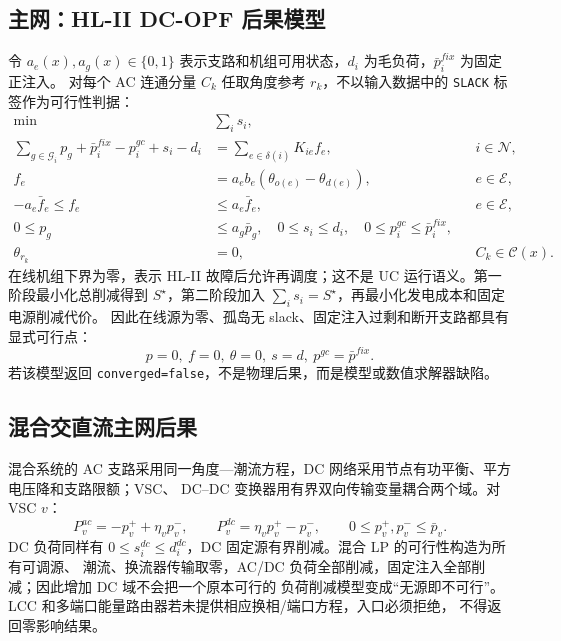 \subsection{主网：HL-II DC-OPF 后果模型}
令 $a_e(x),a_g(x)\in\{0,1\}$ 表示支路和机组可用状态，$d_i$ 为毛负荷，$\bar p_i^{fix}$ 为固定正注入。
对每个 AC 连通分量 $C_k$ 任取角度参考 $r_k$，不以输入数据中的 \texttt{SLACK} 标签作为可行性判据：
\begin{subequations}\label{eq:physical-main-dcopf}
\begin{align}
 \min\quad & \sum_i s_i,\\
 \sum_{g\in\mathcal G_i}p_g+\bar p_i^{fix}-p_i^{gc}+s_i-d_i
 &=\sum_{e\in\delta(i)}K_{ie}f_e, &&i\in\mathcal N,\\
 f_e&=a_e b_e(\theta_{o(e)}-\theta_{d(e)}),&&e\in\mathcal E,\\
 -a_e\bar f_e\le f_e&\le a_e\bar f_e,&&e\in\mathcal E,\\
 0\le p_g&\le a_g\bar p_g,\quad 0\le s_i\le d_i,\quad
 0\le p_i^{gc}\le\bar p_i^{fix},\\
 \theta_{r_k}&=0,&&C_k\in\mathcal C(x).
\end{align}
\end{subequations}
在线机组下界为零，表示 HL-II 故障后允许再调度；这不是 UC 运行语义。第一阶段最小化总削减得到
$S^\star$，第二阶段加入 $\sum_i s_i=S^\star$，再最小化发电成本和固定电源削减代价。
因此在线源为零、孤岛无 slack、固定注入过剩和断开支路都具有显式可行点：
\begin{equation}
 p=0,\ f=0,\ \theta=0,\ s=d,\ p^{gc}=\bar p^{fix}.
 \label{eq:physical-main-feasible-point}
\end{equation}
若该模型返回 \texttt{converged=false}，不是物理后果，而是模型或数值求解器缺陷。

\subsection{混合交直流主网后果}
混合系统的 AC 支路采用同一角度—潮流方程，DC 网络采用节点有功平衡、平方电压降和支路限额；VSC、
DC--DC 变换器用有界双向传输变量耦合两个域。对 VSC $v$：
\begin{equation}
 P_v^{ac}=-p_v^++\eta_vp_v^-,\qquad
 P_v^{dc}=\eta_vp_v^+-p_v^-,\qquad 0\le p_v^+,p_v^-\le\bar p_v.
 \label{eq:physical-vsc-transfer}
\end{equation}
DC 负荷同样有 $0\le s_i^{dc}\le d_i^{dc}$，DC 固定源有界削减。混合 LP 的可行性构造为所有可调源、
潮流、换流器传输取零，AC/DC 负荷全部削减，固定注入全部削减；因此增加 DC 域不会把一个原本可行的
负荷削减模型变成“无源即不可行”。LCC 和多端口能量路由器若未提供相应换相/端口方程，入口必须拒绝，
不得返回零影响结果。

